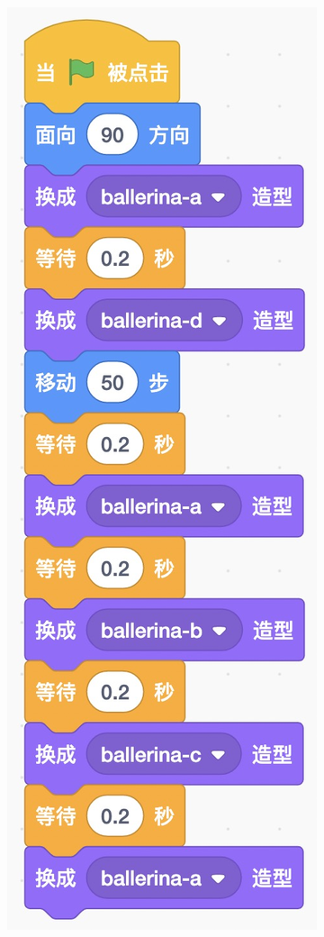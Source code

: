 \documentclass[10pt, a4paper]{article}
\begin{document}
\begin{enumerate}
\begin{figure}[htbp]
\begin{minipage}[t]{.48\textwidth}
                \begin{minipage}{.28\textwidth}
                    \centering
                    \includegraphics[width=.7\textwidth]{8-2.jpg}

\end{minipage}
\end{minipage}
\end{figure}
\end{enumerate}
\end{document}
